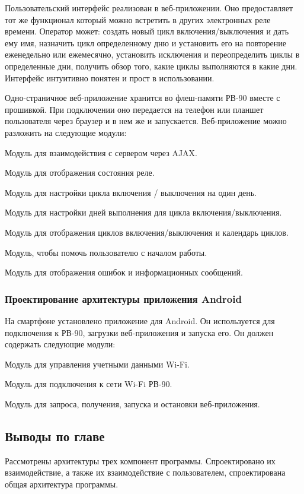 Пользовательский интерфейс реализован в веб-приложении. Оно предоставляет тот же функционал который можно встретить в других электронных реле времени. Оператор может: создать новый цикл включения/выключения и дать ему имя, назначить цикл определенному дню и установить его на повторение еженедельно или ежемесячно, установить исключения и переопределить циклы в определенные дни, получить обзор того, какие циклы выполняются в какие дни. Интерфейс интуитивно понятен и прост в использовании.

Одно-страничное веб-приложение хранится во флеш-памяти РВ-90 вместе с прошивкой. При подключении оно передается на телефон или планшет пользователя через браузер и в нем же и запускается. Веб-приложение можно разложить на следующие модули:

\begin{my_itemize}
\item Модуль для взаимодействия с сервером через AJAX.
\item Модуль для отображения состояния реле.
\item Модуль для настройки цикла включения / выключения на один день.
\item Модуль для настройки дней выполнения для цикла включения/выключения.
\item Модуль для отображения циклов включения/выключения и календарь циклов.
\item Модуль, чтобы помочь пользователю с началом работы.
\item Модуль для отображения ошибок и информационных сообщений.
\end{my_itemize}



\subsubsection{Проектирование архитектуры приложения Android}
На смартфоне установлено приложение для Android. Он используется для подключения к РВ-90, загрузки веб-приложения и запуска его. Он должен содержать следующие модули:

\begin{my_itemize}
\item Модуль для управления учетными данными Wi-Fi.
\item Модуль для подключения к сети Wi-Fi РВ-90.
\item Модуль для запроса, получения, запуска и остановки веб-приложения.
\end{my_itemize}


\subsection{Выводы по главе}
Рассмотрены архитектуры трех компонент программы. Спроектировано их взаимодействие, а также их взаимодействие с пользователем, спроектирована общая архитектура программы.

